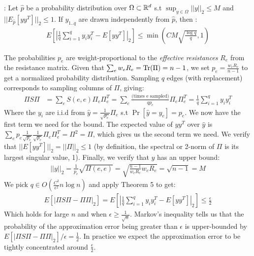 \documentclass{article}
\begin{document}
\noindent
{}: Let $\hat{p}$ be a probability
distribution over $\Omega \subset \mathbb{R}^d$ s.t $\sup_{y \in \Omega} ||y||_2
\leq M$ and $||E_{\hat{p}}[yy^T]||_2 \leq 1$. If $y_{1..q}$ are drawn
independently from $\hat{p}$, then \cite{TheSurvey}
\cite{SpielmanSrivastava} \cite{RudelsonVershynin}:
\begin{align*}
    E\left[\left| \frac{1}{q} \sum^q_{i=1} y_iy^T_i - E[yy^T] \right|_2
    \right] \leq \min\left(CM\sqrt{\frac{\log q}{q}}, 1\right)
\end{align*}

The probabilities $p_e$ are weight-proportional to the \textit{effective
resistances} $R_e$ from the resistance matrix. Given that $\sum_e w_eR_e =
\text{Tr}(\Pi) = n - 1$, we set $p_e = \frac{w_eR_e}{n - 1}$ to get a normalized
probability distribution. Sampling $q$ edges (with replacement) corresponds
to sampling columns of $\Pi$, giving:
\begin{align*}
    \Pi S\Pi &= \sum_e S(e, e)\Pi_e\Pi^T_e
             = \sum_e \frac{\text{(times e sampled)}}{qp_e}\Pi_e\Pi^T_e
             = \frac{1}{q}\sum_{i=1}^q y_iy^T_i
\end{align*}
Where the $y_i$ are i.i.d from $\hat{y} = \frac{1}{\sqrt{p_e}}\Pi_e$ s.t
$\Pr[\hat{y} = y_e] = p_e$. We now have the first term we need for the
bound. The expected value of $yy^T$ over $\hat{y}$ is $\sum_e
p_e\frac{1}{\sqrt{p_e}}\frac{1}{\sqrt{p_e}}\Pi_e\Pi^T_e = \Pi^2 = \Pi$,
which gives us the second term we need. We verify that $||E[yy^T]||_2 =
||\Pi||_2 \leq 1$ (by definition, the spectral or 2-norm of $\Pi$ is its
largest singular value, 1). Finally, we verify that $y$ has an upper bound:
\begin{align*}
    ||y||_2 = \frac{1}{p_e}\sqrt{\Pi(e, e)} = \sqrt{\frac{n -
    1}{w_eR_e}w_eR_e} = \sqrt{n-1} = M
\end{align*}
We pick $q \in O(\frac{C^2}{\epsilon^2}n\log n)$ and apply Theorem 5 to get:
\begin{align*}
    E[|\Pi S \Pi - \Pi\Pi|_2] =
    E\left[\left| \frac{1}{q} \sum^q_{i=1} y_iy^T_i - E[yy^T] \right|_2
    \right] \leq \frac{\epsilon}{2}
\end{align*}
Which holds for large $n$ and when $\epsilon \geq \frac{1}{\sqrt{n}}$.
Markov's inequality tells us that the probability of the approximation error
being greater than $\epsilon$ is upper-bounded by $E[|\Pi S \Pi -
\Pi\Pi|_2]/\epsilon = \frac{1}{2}$. In practice we expect the approximation
error to be tightly concentrated around $\frac{\epsilon}{2}$.
\end{document}
